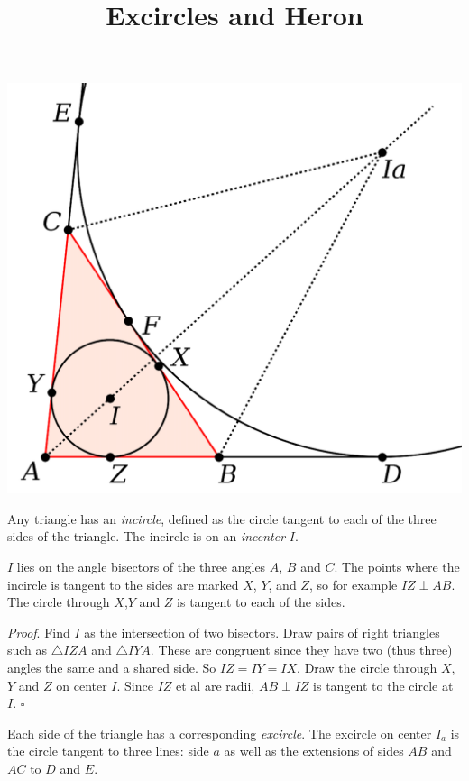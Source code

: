 \documentclass[11pt, oneside]{article}
\title{Excircles and Heron}
\date{}
\begin{document}
\maketitle
\Large


\begin{center} \includegraphics [scale=0.40] {excircle_crop1.png} \end{center}
Any triangle has an \emph{incircle}, defined as the circle tangent to each of the three sides of the triangle.  The incircle is on an \emph{incenter} $I$.

$I$ lies on the angle bisectors of the three angles $A$, $B$ and $C$.  The points where the incircle is tangent to the sides are marked $X$, $Y$, and $Z$, so for example $IZ \perp AB$.  The circle through $X$,$Y$ and $Z$ is tangent to each of the sides.  

\emph{Proof}.  Find $I$ as the intersection of two bisectors.  Draw pairs of right triangles such as $\triangle IZA$ and $\triangle IYA$.  These are congruent since they have two (thus three) angles the same and a shared side. So $IZ = IY = IX$.  Draw the circle through $X$, $Y$ and $Z$ on center $I$.  Since $IZ$ et al are radii, $AB \perp IZ$ is tangent to the circle at $I$.  $\square$

Each side of the triangle has a corresponding \emph{excircle}.  The excircle on center $I_a$ is the circle tangent to three lines:  side $a$ as well as the extensions of sides $AB$ and $AC$ to $D$ and $E$.
\end{document}
